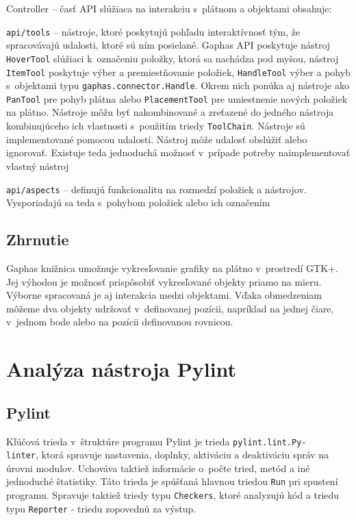 \documentclass[11pt,oneside,final]{fithesis2}
\begin{document}
\begin{list}{•}{}
\item Controller -- časť API slúžiaca na interakciu s~plátnom a objektami obsahuje:
    \begin{list}{•}{}
		\item \texttt{api/tools} -- nástroje, ktoré poskytujú pohľadu interaktívnosť tým, že spracovávajú udalosti, ktoré sú ním posielané. Gaphas API poskytuje nástroj \texttt{HoverTool} slúžiaci k~označeniu položky, ktorá sa nachádza pod myšou, nástroj \texttt{ItemTool} poskytuje výber a premiestňovanie položiek, \texttt{HandleTool} výber a pohyb s~objektami typu \texttt{gaphas.connector.Handle}. Okrem nich ponúka aj nástroje ako \texttt{PanTool} pre pohyb plátna alebo \texttt{PlacementTool} pre umiestnenie nových položiek na plátno. Nástroje môžu byť nakombinované a zreťazené do jedného nástroja kombinujúceho ich vlastnosti s~použitím triedy \texttt{ToolChain}. Nástroje sú implementované pomocou udalostí. Nástroj môže udalosť obslúžiť alebo ignorovať. Existuje teda jednoduchá možnosť v~prípade potreby naimplementovať vlastný nástroj
		\item \texttt{api/aspects} -- definujú funkcionalitu na rozmedzí položiek a nástrojov. Vysporiadajú sa teda s~pohybom položiek alebo ich označením
    \end{list}


\end{list}



	\subsection{Zhrnutie}

		Gaphas knižnica umožnuje vykresľovanie grafiky na plátno v~prostredí GTK+. Jej výhodou je možnosť prispôsobiť vykresľované objekty priamo na mieru. Výborne spracovaná je aj interakcia medzi objektami. Vďaka obmedzeniam môžeme dva objekty udržovať v~definovanej pozícii, napríklad na jednej čiare, v~jednom bode alebo na pozícii definovanou rovnicou.
    
    
\section{Analýza nástroja Pylint}

	\subsection{Pylint}
		Kľúčová trieda v~štruktúre programu Pylint je trieda \texttt{pylint.lint.Py-\\linter}, ktorá spravuje nastavenia, doplnky, aktiváciu a deaktiváciu správ na úrovni modulov. Uchováva taktiež informácie o~počte tried, metód a iné jednoduché štatistiky. Táto trieda je spúšťaná hlavnou triedou \texttt{Run} pri spustení programu. Spravuje taktiež triedy typu \texttt{Checkers}, ktoré analyzujú kód a triedu typu \texttt{Reporter} - triedu zopovednú za výstup. 
		
\end{document}
